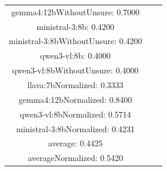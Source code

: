 \documentclass[a4paper]{article}
\begin{document}
\begin{tabular}{ccc}
gemma4:12bWithoutUnsure: 0.7000 \\ ministral-3:8b: 0.4200 \\ ministral-3:8bWithoutUnsure: 0.4200 \\ qwen3-vl:8b: 0.4000 \\ qwen3-vl:8bWithoutUnsure: 0.4000 \\ llava:7bNormalized: 0.3333 \\ gemma4:12bNormalized: 0.8400 \\ qwen3-vl:8bNormalized: 0.5714 \\ ministral-3:8bNormalized: 0.4231 \\ average: 0.4425 \\ averageNormalized: 0.5420 \end{minipage}\\
\end{tabular}

\vspace{5mm}
\end{document}
